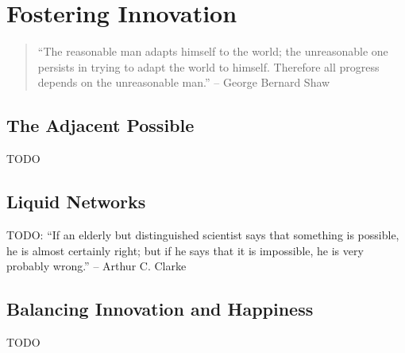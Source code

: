%
%


\chapter{Fostering Innovation}

\begin{quote}
``The reasonable man adapts himself to the world; the unreasonable one persists in trying to adapt the world to himself. Therefore all progress depends on the unreasonable man.'' -- George Bernard Shaw
\end{quote}


\section{The Adjacent Possible}

TODO


\section{Liquid Networks}

TODO: ``If an elderly but distinguished scientist says that something is possible, he is almost certainly right; but if he says that it is impossible, he is very probably wrong.'' -- Arthur C. Clarke

\section{Balancing Innovation and Happiness}

TODO


\newpage
\thispagestyle{empty}





